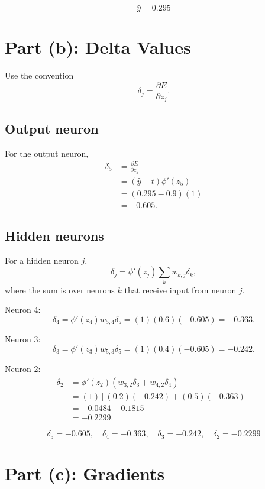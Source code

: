 \documentclass[11pt]{article}
\begin{document}
\[
    \boxed{\hat{y}=0.295}
\]

\section*{Part (b): Delta Values}

Use the convention
\[
    \delta_j=\frac{\partial E}{\partial z_j}.
\]

\subsection*{Output neuron}

For the output neuron,
\[
\begin{aligned}
    \delta_5
    &=
    \frac{\partial E}{\partial z_5} \\
    &=
    (\hat{y}-t)\phi'(z_5) \\
    &=
    (0.295-0.9)(1) \\
    &=
    -0.605.
\end{aligned}
\]

\subsection*{Hidden neurons}

For a hidden neuron \(j\),
\[
    \delta_j
    =
    \phi'(z_j)\sum_k w_{k,j}\delta_k,
\]
where the sum is over neurons \(k\) that receive input from neuron \(j\).

Neuron 4:
\[
    \delta_4
    =
    \phi'(z_4)w_{5,4}\delta_5
    =
    (1)(0.6)(-0.605)
    =
    -0.363.
\]

Neuron 3:
\[
    \delta_3
    =
    \phi'(z_3)w_{5,3}\delta_5
    =
    (1)(0.4)(-0.605)
    =
    -0.242.
\]

Neuron 2:
\[
\begin{aligned}
    \delta_2
    &=
    \phi'(z_2)\left(w_{3,2}\delta_3+w_{4,2}\delta_4\right) \\
    &=
    (1)\left[(0.2)(-0.242)+(0.5)(-0.363)\right] \\
    &=
    -0.0484-0.1815 \\
    &=
    -0.2299.
\end{aligned}
\]

\[
    \boxed{
    \delta_5=-0.605,\quad
    \delta_4=-0.363,\quad
    \delta_3=-0.242,\quad
    \delta_2=-0.2299
    }
\]

\section*{Part (c): Gradients}
\end{document}
